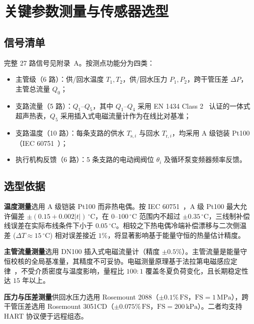 \documentclass[11pt,a4paper]{ctexart}
\begin{document}
\section{关键参数测量与传感器选型}\label{sec:sensor}
\subsection{信号清单}
完整 27 路信号见附录~A。按测点功能分为四类：
\begin{itemize}[leftmargin=*,itemsep=1pt]
    \item 主管级（6 路）：供/回水温度 $T_1,T_2$，供/回水压力 $P_1,P_2$，跨干管压差 $\Delta P$，主管总流量 $Q_0$；
    \item 支路流量（5 路）：$Q_1$--$Q_5$，其中 $Q_1$--$Q_4$ 采用 EN 1434 Class 2~\cite{en1434} 认证的一体式超声热表，$Q_5$ 采用插入式电磁流量计作为在线比对基准；
    \item 支路温度（10 路）：每条支路的供水 $T_{\mathrm{s},i}$ 与回水 $T_{\mathrm{r},i}$，均采用 A 级铠装 Pt100（IEC 60751~\cite{iec60751}）；
    \item 执行机构反馈（6 路）：5 条支路的电动阀阀位 $\theta_i$ 及循环泵变频器频率反馈。
\end{itemize}

\subsection{选型依据}
\textbf{温度测量}\quad 选用 A 级铠装 Pt100 而非热电偶。按 IEC 60751~\cite{iec60751}，A 级 Pt100 最大允许偏差 $\pm(0.15+0.002|t|)\,\mathrm{^\circ C}$，在 $0$--$100\,\mathrm{^\circ C}$ 范围内不超过 $\pm 0.35\,\mathrm{^\circ C}$，三线制补偿线误差在实际布线条件下小于 $0.05\,\mathrm{^\circ C}$。相较之下热电偶冷端补偿漂移与二次侧温差 ($\Delta T\approx 15\,\mathrm{^\circ C}$) 相对误差接近 $1\%$，将显著影响基于能量守恒的热量估计精度。

\textbf{主管流量测量}\quad 选用 DN100 插入式电磁流量计（精度 $\pm 0.5\%$）。主管流量是能量守恒校核的全局基准量，其精度不可妥协。电磁测量原理基于法拉第电磁感应定律~\cite{baker2016flow}，不受介质密度与温度影响，量程比 $100{:}1$ 覆盖冬夏负荷变化，且长期稳定性达 $15$ 年以上。

\textbf{压力与压差测量}\quad 供回水压力选用 Rosemount 2088（$\pm 0.1\%\,\mathrm{FS}$，$\mathrm{FS}=1\,\mathrm{MPa}$），跨干管压差选用 Rosemount 3051CD（$\pm 0.075\%\,\mathrm{FS}$，$\mathrm{FS}=200\,\mathrm{kPa}$）。二者均支持 HART 协议便于远程组态。
\end{document}

